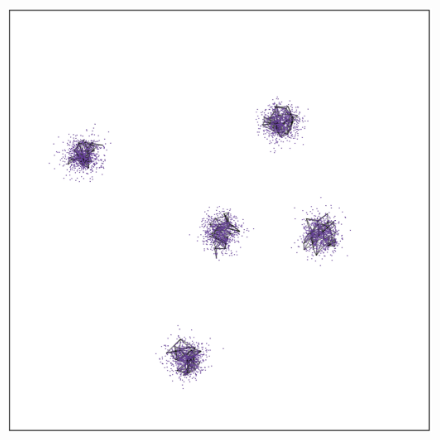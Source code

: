 \documentclass[
  12pt]{article}
\begin{document}
\begin{figure}[H]
\begin{minipage}[t]{0.33\linewidth}
{{\includegraphics{figures/five_gau_clusters/sc_umap_2.png}

}

}

\subcaption{\label{fig-gau2_sc2}}
\end{minipage}%
%
\begin{minipage}[t]{0.33\linewidth}

{\centering 

}
\end{minipage}
\end{figure}
\end{document}
